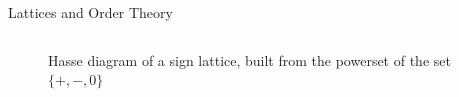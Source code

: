 \documentclass[aspectratio=169]{beamer}
\begin{document}
\begin{frame}{Lattices and Order Theory}
\begin{columns}[T]
\begin{column}{0.4\textwidth}
\begin{figure}[h]
    \caption{\footnotesize Hasse diagram of a sign lattice, built from the powerset of the set $\{+,-,0\}$}
  \end{figure}
  \end{column}
  \end{columns}
\end{frame}
\endgroup %
\end{document}
